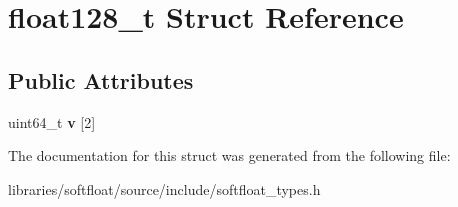 \hypertarget{structfloat128__t}{}\section{float128\+\_\+t Struct Reference}
\label{structfloat128__t}
\subsection*{Public Attributes}
\begin{DoxyCompactItemize}
\item 
\mbox{\label{structfloat128__t_ab69817c1aa87163563e551517c5ef110}} 
uint64\+\_\+t {\bfseries v} \mbox{[}2\mbox{]}
\end{DoxyCompactItemize}


The documentation for this struct was generated from the following file\+:\begin{DoxyCompactItemize}
\item 
libraries/softfloat/source/include/softfloat\+\_\+types.\+h\end{DoxyCompactItemize}
